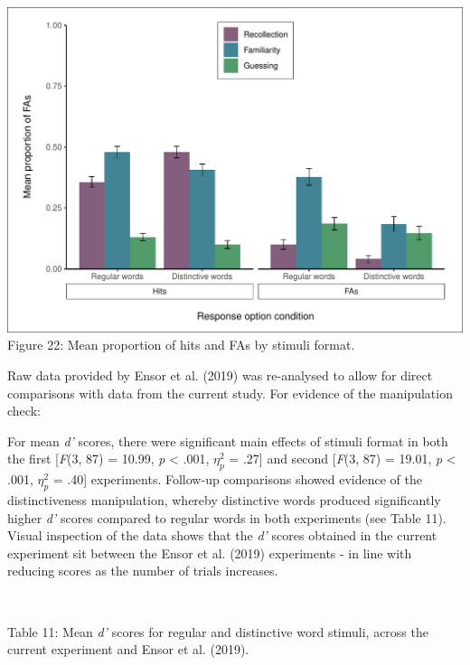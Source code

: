 \documentclass[
  11pt,
]{article}
\begin{document}
\includegraphics{R--Thesis_files/figure-latex/unnamed-chunk-66-1.pdf}
Figure 22: Mean proportion of hits and FAs by stimuli format.

\newpage

Raw data provided by Ensor et al. (2019) was re-analysed to allow for
direct comparisons with data from the current study. For evidence of the
manipulation check:

For mean \emph{d'} scores, there were significant main effects of
stimuli format in both the first {[}\emph{F}(3, 87) = 10.99, \emph{p}
\textless{} .001, \(\eta^2_p\) = .27{]} and second {[}\emph{F}(3, 87) =
19.01, \emph{p} \textless{} .001, \(\eta^2_p\) = .40{]} experiments.
Follow-up comparisons showed evidence of the distinctiveness
manipulation, whereby distinctive words produced significantly higher
\emph{d'} scores compared to regular words in both experiments (see
Table 11). Visual inspection of the data shows that the \emph{d'} scores
obtained in the current experiment sit between the Ensor et al. (2019)
experiments - in line with reducing scores as the number of trials
increases.

~

Table 11: Mean \emph{d'} scores for regular and distinctive word
stimuli, across the current experiment and Ensor et al. (2019).
\begingroup\fontsize{10}{12}\selectfont
\end{document}
